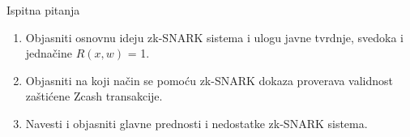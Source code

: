 \documentclass[aspectratio=1610]{beamer}
\begin{document}
\begin{frame}{Ispitna pitanja}
\begin{enumerate}
    \item Objasniti osnovnu ideju zk-SNARK sistema i ulogu javne tvrdnje, svedoka i jednačine \(R(x,w)\) = 1.

    \item Objasniti na koji način se pomoću zk-SNARK dokaza proverava validnost zaštićene Zcash transakcije.

    \item Navesti i objasniti glavne prednosti i nedostatke zk-SNARK sistema.
\end{enumerate}
\end{frame}
\end{document}
